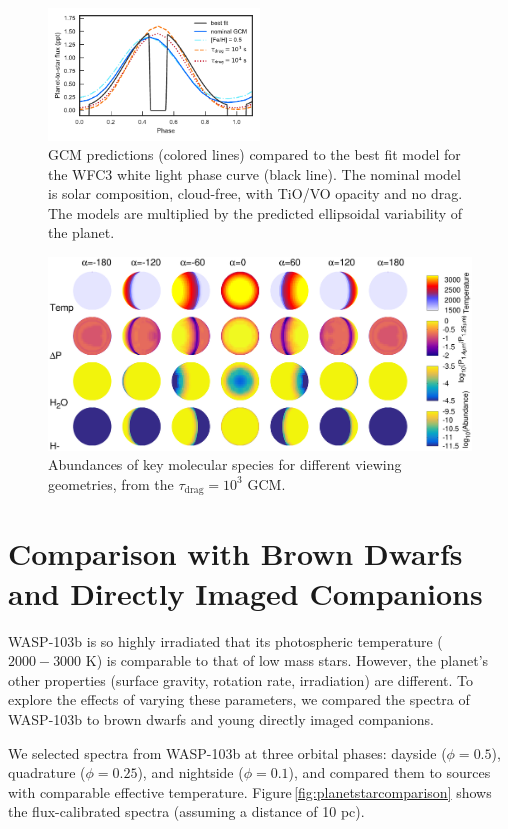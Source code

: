 \documentclass[twocolumn]{aastex61}
\begin{document}
\begin{figure}
\includegraphics[width = 0.5\textwidth]{Figures/gcm_comparison.pdf}
\caption{GCM predictions (colored lines) compared to the best fit model for the WFC3 white light phase curve (black line). The nominal model is solar composition, cloud-free, with TiO/VO opacity and no drag. The models are multiplied by the predicted ellipsoidal variability of the planet.}
\label{fig:gcmcomparison}
\end{figure}

\begin{figure}
	\includegraphics[width = 1.0\textwidth]{Figures/GCM_abundances.eps}
\caption{Abundances of key molecular species for different viewing geometries, from the $\tau_\mathrm{drag} = 10^3$ GCM.}
\label{fig:GCMabundance}
\end{figure}


\section{Comparison with Brown Dwarfs and Directly Imaged Companions}
WASP-103b is so highly irradiated that its photospheric temperature ($2000 - 3000$ K) is comparable to that of low mass stars. However, the planet's other properties (surface gravity, rotation rate, irradiation) are different. To explore the effects of varying these parameters, we compared the spectra of WASP-103b to brown dwarfs and young directly imaged companions. 

We selected spectra from WASP-103b at three orbital phases: dayside ($\phi = 0.5$), quadrature ($\phi = 0.25$), and nightside ($\phi = 0.1$), and compared them to sources with comparable effective temperature. Figure\,\ref{fig:planetstarcomparison} shows the flux-calibrated spectra (assuming a distance of 10 pc).
\end{document}
